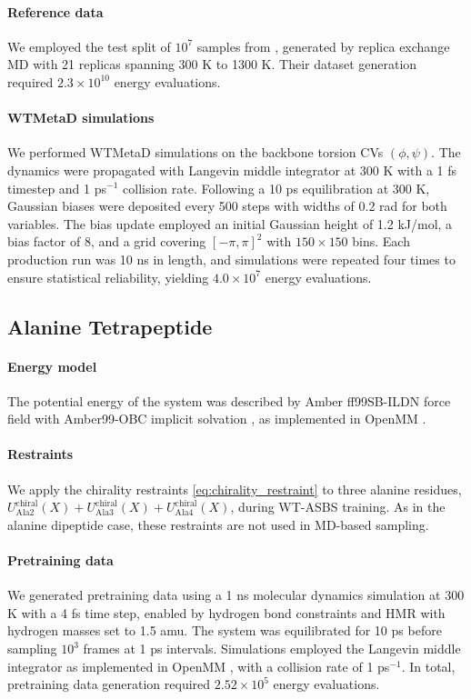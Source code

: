 \documentclass[]{fairmeta}
\theoremstyle{remark}
\begin{document}
\paragraph{Reference data}
We employed the test split of $10^7$ samples from \citet{midgley2022flow}, generated by replica exchange MD with 21 replicas spanning 300 K to 1300 K.
Their dataset generation required $2.3 \times 10^{10}$ energy evaluations.

\paragraph{WTMetaD simulations}
We performed WTMetaD simulations on the backbone torsion CVs $(\phi,\psi)$.
The dynamics were propagated with Langevin middle integrator \citep{zhang2019unified} at 300 K with a 1 fs timestep and 1 ps$^{-1}$ collision rate.
Following a 10 ps equilibration at 300 K, Gaussian biases were deposited every 500 steps with widths of 0.2 rad for both variables.
The bias update employed an initial Gaussian height of 1.2 kJ/mol, a bias factor of 8, and a grid covering $[-\pi,\pi]^2$ with $150 \times 150$ bins.
Each production run was 10 ns in length, and simulations were repeated four times to ensure statistical reliability, yielding $4.0 \times 10^7$ energy evaluations.

\subsection{Alanine Tetrapeptide}
\paragraph{Energy model}
The potential energy of the system was described by
Amber ff99SB-ILDN force field \citep{lindorff2010improved} with Amber99-OBC implicit solvation \citep{onufriev2004exploring}, as implemented in OpenMM \citep{eastman2023openmm}.

\paragraph{Restraints}
We apply the chirality restraints \cref{eq:chirality_restraint} to three alanine residues, $U_\text{Ala2}^\text{chiral}(X) + U_\text{Ala3}^\text{chiral}(X) + U_\text{Ala4}^\text{chiral}(X)$, during WT-ASBS training.
As in the alanine dipeptide case, these restraints are not used in MD-based sampling.

\paragraph{Pretraining data}
We generated pretraining data using a 1 ns molecular dynamics simulation at 300 K with a 4 fs time step, enabled by hydrogen bond constraints and HMR with hydrogen masses set to 1.5 amu.
The system was equilibrated for 10 ps before sampling $10^3$ frames at 1 ps intervals.
Simulations employed the Langevin middle integrator \citep{zhang2019unified} as implemented in OpenMM \citep{eastman2023openmm}, with a collision rate of 1 ps$^{-1}$.
In total, pretraining data generation required $2.52 \times 10^5$ energy evaluations.
\end{document}
